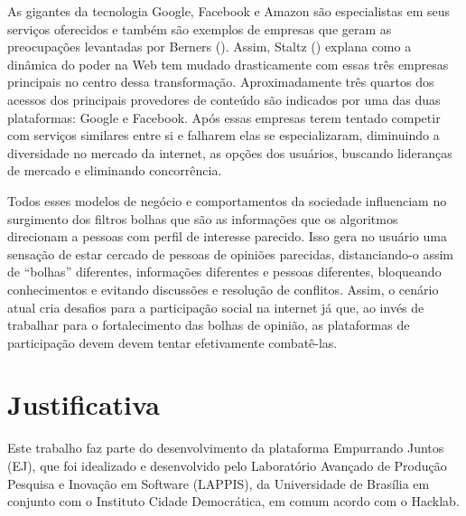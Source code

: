 
As gigantes da tecnologia Google, Facebook e Amazon são especialistas em seus serviços oferecidos e também são exemplos de empresas que geram as preocupações levantadas por Berners (\citeyear{berners2017}). Assim, Staltz (\citeyear{staltz2017}) explana como a dinâmica do poder na Web tem mudado drasticamente com essas três empresas principais no centro dessa transformação. %
Aproximadamente três quartos dos acessos dos principais provedores de conteúdo 
são indicados por uma das duas plataformas: Google e Facebook.
Após essas empresas terem tentado competir com serviços similares entre si e falharem %
 elas se especializaram, diminuindo a diversidade no mercado da internet, as opções dos usuários, buscando lideranças de mercado e eliminando concorrência.

Todos esses modelos de negócio e comportamentos da sociedade influenciam no surgimento dos filtros bolhas que são as informações que os algoritmos direcionam a pessoas com perfil de interesse parecido. Isso gera no usuário uma sensação de estar cercado de pessoas de opiniões parecidas, distanciando-o assim de “bolhas” diferentes, informações diferentes e pessoas diferentes, bloqueando conhecimentos e evitando discussões e resolução de conflitos. Assim, o cenário atual cria desafios para a participação social na internet já que, ao invés de trabalhar para o fortalecimento das bolhas de opinião, as plataformas de participação devem devem tentar efetivamente combatê-las.

\section{Justificativa}

Este trabalho faz parte do desenvolvimento da plataforma Empurrando Juntos (EJ), que foi idealizado e desenvolvido pelo Laboratório Avançado de Produção Pesquisa e Inovação em Software (LAPPIS), da Universidade de Brasília em conjunto com o Instituto Cidade Democrática, em comum acordo com o Hacklab. 

